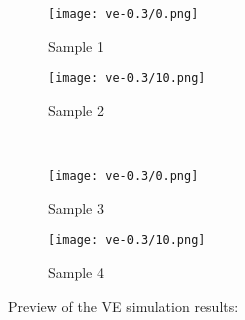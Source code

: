 \begin{figure}[h!]
    \centering
    \begin{subfigure}[b]{0.4\linewidth}
      \texttt{[image: ve-0.3/0.png]}
      \caption{Sample 1}
    \end{subfigure}

    \begin{subfigure}[b]{0.4\linewidth}
      \texttt{[image: ve-0.3/10.png]}
      \caption{Sample 2}
    \end{subfigure}\\[1ex]
    \begin{subfigure}[b]{0.4\linewidth}
      \texttt{[image: ve-0.3/0.png]}
      \caption{Sample 3}
    \end{subfigure} \hspace{20.0}
    \begin{subfigure}[b]{0.4\linewidth}
      \texttt{[image: ve-0.3/10.png]}
      \caption{Sample 4}
    \end{subfigure}
    \caption{Preview of the VE simulation results:}
    \label{fig:codebook200}
\end{figure}